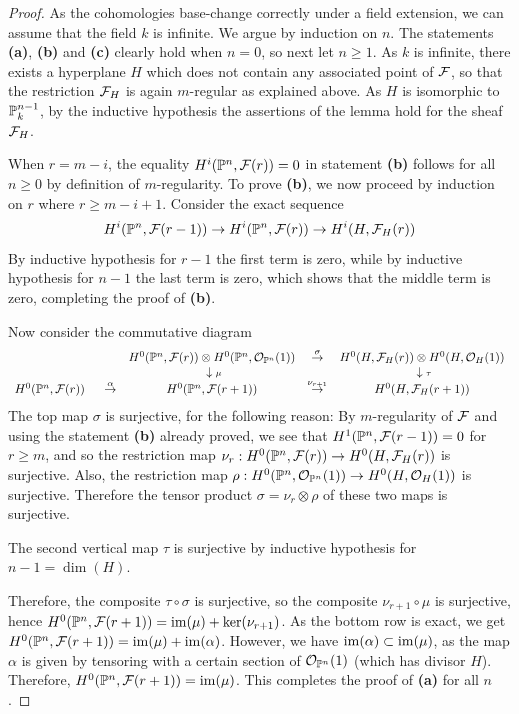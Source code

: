 \begin{proof} As the cohomologies base-change correctly under a field extension,
we can assume that the field $k$ is infinite.
We argue by induction on $n$. The statements
\textbf{(a)}, \textbf{(b)} and \textbf{(c)} clearly hold when $n=0$, so
next let $n\ge 1$.
As $k$ is infinite, there exists a hyperplane $H$
which does not contain any associated point of $\mathcal{F}$, so that
the restriction $\mathcal{F}_H$ is again $m$-regular as explained above.
As $H$ is isomorphic to $\mathbb{P}^{n-1}_k$, by the
inductive hypothesis the assertions of the lemma hold for the sheaf $\mathcal{F}_H$.

When $r=m-i$, the equality $H^i(\mathbb{P}^n, \mathcal{F}(r))=0$ in statement \textbf{(b)}
follows for all $n\ge 0$ by definition of $m$-regularity.
To prove \textbf{(b)}, we now proceed by induction on $r$ where
$r\ge m-i+1$. Consider the exact sequence
$$H^i(\mathbb{P}^n, \mathcal{F}(r-1)) \to H^i(\mathbb{P}^n, \mathcal{F}(r)) \to
H^i(H, \mathcal{F}_H(r))$$
By inductive hypothesis for $r-1$
the first term is zero,
while by inductive hypothesis for $n-1$
the last term is zero, which shows that the middle term is zero,
completing the proof of \textbf{(b)}.

Now consider the commutative diagram
{\footnotesize%
$$\begin{array}{lccc}
& H^0(\mathbb{P}^n, \mathcal{F}(r))\otimes H^0(\mathbb{P}^n,{\mathcal O}_{\mathbb{P}^n}(1))&
\stackrel{\sigma}{\to}& H^0(H, \mathcal{F}_H(r))\otimes H^0(H, {\mathcal O}_H(1)) \\
& ~\downarrow {\scriptstyle \mu}& & ~\downarrow {\scriptstyle \tau}\\
H^0(\mathbb{P}^n, \mathcal{F}(r))~~~~ \stackrel{\alpha}{\to} & H^0(\mathbb{P}^n, \mathcal{F}(r+1))
& \stackrel{\nu_{r+1}}{\to} & H^0(H, \mathcal{F}_H(r+1))
\end{array}$$
}
The top map $\sigma$ is surjective, for the following reason:
By $m$-regularity of $\mathcal{F}$ and using the statement \textbf{(b)}
already proved, we see that
$H^1(\mathbb{P}^n, \mathcal{F}(r-1))=0$ for $r\ge m$, and so the restriction map
$\nu_r: H^0(\mathbb{P}^n, \mathcal{F}(r)) \to H^0(H, \mathcal{F}_H(r))$ is surjective.
Also, the restriction map
$\rho : H^0(\mathbb{P}^n,{\mathcal O}_{\mathbb{P}^n}(1)) \to H^0(H, {\mathcal O}_H(1))$ is surjective.
Therefore the tensor product $\sigma = \nu_r \otimes \rho$
of these two maps is surjective.

The second vertical map $\tau$ is surjective by inductive
hypothesis for $n-1 = \dim(H)$.

Therefore, the composite $\tau\circ \sigma$ is surjective,
so the composite $\nu_{r+1}\circ\mu$ is surjective,
hence $H^0(\mathbb{P}^n, \mathcal{F}(r+1)) = \operatorname{im}(\mu) + \operatorname{ker}(\nu_{r+1})$.
As the bottom row is exact, we get
$H^0(\mathbb{P}^n, \mathcal{F}(r+1)) =  \operatorname{im}(\mu) + \operatorname{im}(\alpha)$.
However, we have $\operatorname{im}(\alpha) \subset \operatorname{im}(\mu)$, as the map
$\alpha$ is given by tensoring with a certain section of
${\mathcal O}_{\mathbb{P}^n}(1)$ (which has divisor $H$).
Therefore, $H^0(\mathbb{P}^n, \mathcal{F}(r+1)) = \operatorname{im}(\mu)$.
This completes the proof of \textbf{(a)} for all $n$.


\end{proof}
